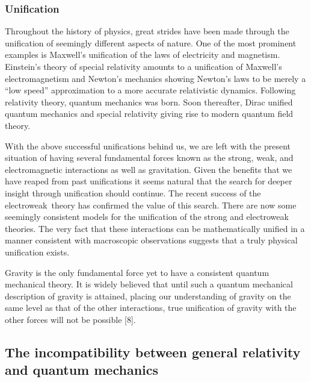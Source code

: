 \subsubsection{Unification}

Throughout the history of physics, great strides have been made through the
unification of seemingly different aspects of nature. One of the most
prominent examples is Maxwell's unification of the laws of electricity and
magnetism. Einstein's theory of special relativity amounts to a unification
of Maxwell's electromagnetism and Newton's mechanics showing Newton's laws
to be merely a ``low speed'' approximation to a more accurate relativistic
dynamics. Following relativity theory, quantum mechanics was born. Soon
thereafter, Dirac unified quantum mechanics and special relativity giving
rise to modern quantum field theory.

With the above successful unifications behind us, we are left with the
present situation of having several fundamental forces known as the strong,
weak, and electromagnetic interactions as well as gravitation. Given the
benefits that we have reaped from past unifications it seems natural that
the search for deeper insight through unification should continue. The
recent success of the electroweak{\it \ }theory has confirmed the value of
this search. There are now some seemingly consistent models for the
unification of the strong and electroweak theories. The very fact that these
interactions can be mathematically unified in a manner consistent with
macroscopic observations suggests that a truly physical unification exists.

Gravity is the only fundamental force yet to have a consistent quantum
mechanical theory. It is widely believed that until such a quantum
mechanical description of gravity is attained, placing our understanding of
gravity on the same level as that of the other interactions, true
unification of gravity with the other forces will not be possible [8].

\subsection{The incompatibility between general relativity and quantum
mechanics}

